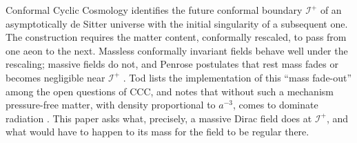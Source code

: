 \documentclass[11pt,a4paper]{article}
\theoremstyle{definition}
\newcommand{\scri}{\mathscr{I}^{+}}
\begin{document}
Conformal Cyclic Cosmology \cite{Penrose2010,Tod2015,MeissnerPenrose2025} identifies the future conformal boundary $\scri$ of an asymptotically de Sitter universe with the initial singularity of a subsequent one. The construction requires the matter content, conformally rescaled, to pass from one aeon to the next. Massless conformally invariant fields behave well under the rescaling; massive fields do not, and Penrose postulates that rest mass fades or becomes negligible near $\scri$ \cite{Penrose2010}. Tod lists the implementation of this ``mass fade-out'' among the open questions of CCC, and notes that without such a mechanism pressure-free matter, with density proportional to $a^{-3}$, comes to dominate radiation \cite{Tod2022}. This paper asks what, precisely, a massive Dirac field does at $\scri$, and what would have to happen to its mass for the field to be regular there.
\end{document}
